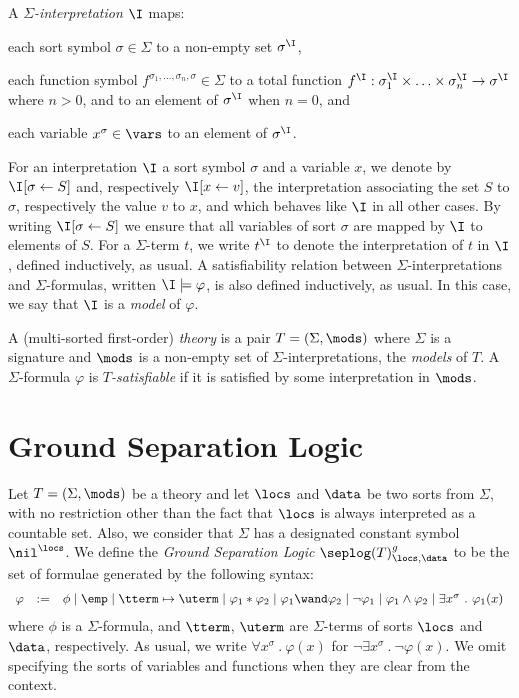 \documentclass[10pt]{llncs}
\begin{document}
A \emph{$\Sigma$-interpretation $\I$} maps:\begin{compactitem}
\item each sort symbol $\sigma \in \Sigma$ to a non-empty set $\sigma^\I$,
\item each function symbol $f^{\sigma_1,\ldots,\sigma_n,\sigma} \in \Sigma$ to a
  total function $f^\I : \sigma^\I_1 \times \ldots \times \sigma^\I_n
  \rightarrow \sigma^\I$ where $n > 0$, and to an element of $\sigma^\I$ when $n
  = 0$, and
\item each variable $x^\sigma \in \vars$ to an element of $\sigma^\I$.
\end{compactitem}

For an interpretation $\I$ a sort symbol $\sigma$ and a variable $x$,
we denote by $\I[\sigma \leftarrow S]$ and, respectively $\I[x
  \leftarrow v]$, the interpretation associating the set $S$ to
$\sigma$, respectively the value $v$ to $x$, and which behaves like
$\I$ in all other cases. By writing $\I[\sigma \leftarrow S]$ we
ensure that all variables of sort $\sigma$ are mapped by $\I$ to
elements of $S$. For a $\Sigma$-term $t$, we write $t^\I$ to denote
the interpretation of $t$ in $\I$, defined inductively, as usual. A
satisfiability relation between $\Sigma$-interpretations and
$\Sigma$-formulas, written $\I \models \varphi$, is also defined
inductively, as usual. In this case, we say that $\I$ is a
\emph{model} of $\varphi$. 

A (multi-sorted first-order) \emph{theory} is a pair \(T = (\Sigma,
\mods)\) where $\Sigma$ is a signature and $\mods$ is a non-empty set
of $\Sigma$-interpretations, the \emph{models} of $T$. A
$\Sigma$-formula $\varphi$ is \emph{$T$-satisfiable} if it is
satisfied by some interpretation in $\mods$.

\section{Ground Separation Logic}
\label{sec:gsl}

Let \(T = (\Sigma, \mods)\) be a theory and let $\locs$ and $\data$ be
two sorts from $\Sigma$, with no restriction other than the fact that
$\locs$ is always interpreted as a countable set. Also, we consider
that $\Sigma$ has a designated constant symbol $\nil^\locs$. We define
the \emph{Ground Separation Logic} $\seplog(T)^g_{\locs,\data}$ to
be the set of formulae generated by the following syntax:
\[\begin{array}{lcl}
\varphi & := & \phi \mid \emp \mid \tterm \mapsto \uterm \mid
\varphi_1 * \varphi_2 \mid \varphi_1 \wand \varphi_2 \mid \neg
\varphi_1 \mid \varphi_1 \wedge \varphi_2 \mid \exists x^\sigma ~.~
\varphi_1(x)
\end{array}\]
where $\phi$ is a $\Sigma$-formula, and $\tterm$, $\uterm$ are
$\Sigma$-terms of sorts $\locs$ and $\data$, respectively. As usual,
we write $\forall x^\sigma ~.~ \varphi(x)$ for $\neg\exists x^\sigma
~.~ \neg\varphi(x)$. We omit specifying the sorts of variables and
functions when they are clear from the context.
\end{document}

